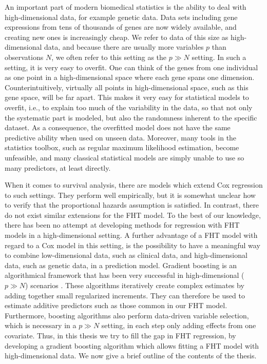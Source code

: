 An important part of modern biomedical statistics is the ability to deal with high-dimensional data, for example genetic data.
Data sets including gene expressions from tens of thousands of genes are now widely available, and creating new ones is increasingly cheap.
We refer to data of this size as high-dimensional data, and because there are usually more variables $p$ than observations $N$, we often refer to this setting as the $p\gg N$ setting.
In such a setting, it is very easy to overfit.
One can think of the genes from one individual as one point in a high-dimensional space where each gene spans one dimension.
Counterintuitively, virtually all points in high-dimensional space, such as this gene space, will be far apart.
This makes it very easy for statistical models to overfit, i.e., to explain too much of the variability in the data, so that not only the systematic part is modeled, but also the randomness inherent to the specific dataset.
As a consequence, the overfitted model does not have the same predictive ability when used on unseen data.
Moreover, many tools in the statistics toolbox, such as regular maximum likelihood estimation, become unfeasible, and many classical statistical models are simply unable to use so many predictors, at least directly.

When it comes to survival analysis, there are models which extend Cox regression to such settings.
They perform well empirically, but it is somewhat unclear how to verify that the proportional hazards assumption is satisfied.
In contrast, there do not exist similar extensions for the FHT model.
To the best of our knowledge, there has been no attempt at developing methods for regression with FHT models in a high-dimensional setting.
A further advantage of a FHT model with regard to a Cox model in this setting, is the possibility to have a meaningful way to combine low-dimensional data, such as clinical data, and high-dimensional data, such as genetic data, in a prediction model.
Gradient boosting \citep{friedman2001} is an algorithmical framework that has been very successful in high-dimensional ($p\gg N$) scenarios \citep{buhlmann-yu, mayr14a, mayr17}.
These algorithms iteratively create complex estimates by adding together small regularized increments.
They can therefore be used to estimate additive predictors such as those common in our FHT model.
Furthermore, boosting algorithms also perform data-driven variable selection, which is necessary in a $p\gg N$ setting, in each step only adding effects from one covariate.
Thus, in this thesis we try to fill the gap in FHT regression, by developing a gradient boosting algorithm which allows fitting a FHT model with high-dimensional data.
We now give a brief outline of the contents of the thesis.


